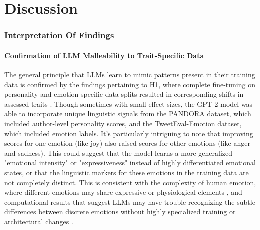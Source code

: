 \documentclass{DESSThesis}
\begin{document}
\chapter{Discussion}
\thispagestyle{empty}

\subsection{Interpretation Of Findings}
\subsubsection{Confirmation of LLM Malleability to Trait-Specific Data}
The general principle that LLMs learn to mimic patterns present in their training data is confirmed by the findings pertaining to H1, where complete fine-tuning on personality and emotion-specific data splits resulted in corresponding shifts in assessed traits \cite{jiang_evaluating_2023, pan_llms_2023, safdari_personality_2023}. Though sometimes with small effect sizes, the GPT-2 model was able to incorporate unique linguistic signals from the PANDORA dataset, which included author-level personality scores, and the TweetEval-Emotion dataset, which included emotion labels. It's particularly intriguing to note that improving scores for one emotion (like joy) also raised scores for other emotions (like anger and sadness). This could suggest that the model learns a more generalized "emotional intensity" or "expressiveness" instead of highly differentiated emotional states, or that the linguistic markers for these emotions in the training data are not completely distinct. This is consistent with the complexity of human emotion, where different emotions may share expressive or physiological elements \cite{paul_towards_2020, nummenmaa_bodily_2014}, and computational results that suggest LLMs may have trouble recognizing the subtle differences between discrete emotions without highly specialized training or architectural changes \cite{chang_modeling_2024, liu_emollms_2024}.
\end{document}
